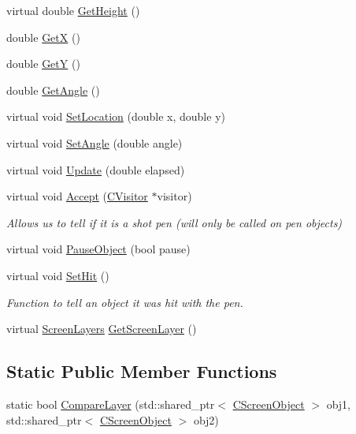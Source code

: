\begin{DoxyCompactItemize}
\item 
virtual double \mbox{\hyperlink{class_c_screen_object_a5951174e223dbfe0fe9ed264905130a9}{Get\+Height}} ()
\item 
double \mbox{\hyperlink{class_c_screen_object_ae39daf9e1080c65e93bdecb87573b984}{GetX}} ()
\item 
double \mbox{\hyperlink{class_c_screen_object_a1c01dbcad26ade4d4989e9b9f61fd0c8}{GetY}} ()
\item 
double \mbox{\hyperlink{class_c_screen_object_ad7450c849f4b4f4f6d66c5acbcaa330c}{Get\+Angle}} ()
\item 
virtual void \mbox{\hyperlink{class_c_screen_object_abf7223b82f96a94c74952ddabf1fed5e}{Set\+Location}} (double x, double y)
\item 
virtual void \mbox{\hyperlink{class_c_screen_object_a3be2f2dc3917c25dc208217cb3acc72c}{Set\+Angle}} (double angle)
\item 
virtual void \mbox{\hyperlink{class_c_screen_object_ab682c1e08f001e666f0cec280e1e9eaa}{Update}} (double elapsed)
\item 
virtual void \mbox{\hyperlink{class_c_screen_object_a1420b59508fdab637367654438223832}{Accept}} (\mbox{\hyperlink{class_c_visitor}{C\+Visitor}} $\ast$visitor)
\begin{DoxyCompactList}\small\item\em Allows us to tell if it is a shot pen (will only be called on pen objects) \end{DoxyCompactList}\item 
virtual void \mbox{\hyperlink{class_c_screen_object_a584fe08e6bdd9efe0c2f06d6f1d53e70}{Pause\+Object}} (bool pause)
\item 
\mbox{\label{class_c_screen_object_afeb43d504f1719a6cf5875cca6d8919c}} 
virtual void \mbox{\hyperlink{class_c_screen_object_afeb43d504f1719a6cf5875cca6d8919c}{Set\+Hit}} ()
\begin{DoxyCompactList}\small\item\em Function to tell an object it was hit with the pen. \end{DoxyCompactList}\item 
virtual \mbox{\hyperlink{_screen_layers_8h_ac283065f0e546466dc00cf224c28d5ac}{Screen\+Layers}} \mbox{\hyperlink{class_c_screen_object_a1a570970d440543b1cfebc1dac9c3efa}{Get\+Screen\+Layer}} ()
\end{DoxyCompactItemize}
\subsection*{Static Public Member Functions}
\begin{DoxyCompactItemize}
\item 
static bool \mbox{\hyperlink{class_c_screen_object_afba7405527ca6eecad5f09c09e539df9}{Compare\+Layer}} (std\+::shared\+\_\+ptr$<$ \mbox{\hyperlink{class_c_screen_object}{C\+Screen\+Object}} $>$ obj1, std\+::shared\+\_\+ptr$<$ \mbox{\hyperlink{class_c_screen_object}{C\+Screen\+Object}} $>$ obj2)
\end{DoxyCompactItemize}
